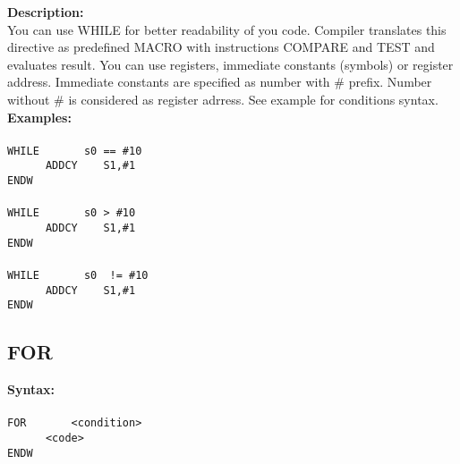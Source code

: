         \textbf{Description:}\\
        You can use WHILE for better readability of you code. Compiler translates this directive as predefined MACRO with instructions COMPARE and TEST and
        evaluates result. You can use registers, immediate constants (symbols) or register address. Immediate constants are specified as number with \# prefix.
        Number without \# is considered as register adrress. See example for conditions syntax.\\
        \textbf{Examples:}\\
        {
            ~\\
            \usecodefont
            \verb'WHILE       s0 == #10'\\
            \verb'      ADDCY    S1,#1'\\
            \verb'ENDW'
        }\\
        {
            ~\\
            \usecodefont
            \verb'WHILE       s0 > #10'\\
            \verb'      ADDCY    S1,#1'\\
            \verb'ENDW'
        }\\
        {
            ~\\
            \usecodefont
            \verb'WHILE       s0  != #10'\\
            \verb'      ADDCY    S1,#1'\\
            \verb'ENDW'
        }\\

        \subsection{FOR}
            \textbf{Syntax:}\\
        {
            ~\\
            \usecodefont
            \verb'FOR       <condition>'\\
            \verb'      <code>'\\
            \verb'ENDW'
        }\\

